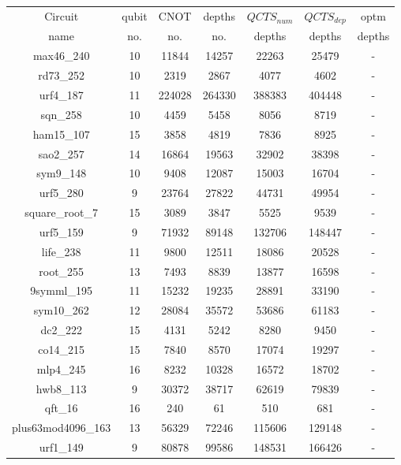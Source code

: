 \documentclass[runningheads]{llncs}
\begin{document}
								\begin{table}[H]
									\begin{center}  
									\begin{tabular}{|c|c|c|c|c|c|c|}
									\hline
									Circuit &  qubit  & CNOT &depths &$QCTS_{num}$& $QCTS_{dep}$  & optm 	  	\\
									 name	&   no. 	&	no. & no. & depths&  depths &  depths 	\\
									\hline
									max46\_240 & 10 & 11844 & 14257 & 22263 & 25479 & - \\
									rd73\_252 & 10 & 2319 & 2867 & 4077 & 4602 & - \\
									urf4\_187 & 11 & 224028 & 264330 & 388383 & 404448 & - \\
									sqn\_258 & 10 & 4459 & 5458 & 8056 & 8719 & - \\
									ham15\_107 & 15 & 3858 & 4819 & 7836 & 8925 & - \\
									sao2\_257 & 14 & 16864 & 19563 & 32902 & 38398 & - \\
									sym9\_148 & 10 & 9408 & 12087 & 15003 & 16704 & - \\
									urf5\_280 & 9 & 23764 & 27822 & 44731 & 49954 & - \\
									square\_root\_7 & 15 & 3089 & 3847 & 5525 & 9539 & - \\
									urf5\_159 & 9 & 71932 & 89148 & 132706 & 148447 & - \\
									life\_238 & 11 & 9800 & 12511 & 18086 & 20528 & - \\
									root\_255 & 13 & 7493 & 8839 & 13877 & 16598 & - \\
									9symml\_195 & 11 & 15232 & 19235 & 28891 & 33190 & - \\
									sym10\_262 & 12 & 28084 & 35572 & 53686 & 61183 & - \\
									dc2\_222 & 15 & 4131 & 5242 & 8280 & 9450 & - \\
									co14\_215 & 15 & 7840 & 8570 & 17074 & 19297 & - \\
									mlp4\_245 & 16 & 8232 & 10328 & 16572 & 18702 & - \\
									hwb8\_113 & 9 & 30372 & 38717 & 62619 & 79839 & - \\
									qft\_16 & 16 & 240 & 61 & 510 & 681 & - \\
									plus63mod4096\_163 & 13 & 56329 & 72246 & 115606 & 129148 & - \\
									urf1\_149 & 9 & 80878 & 99586 & 148531 & 166426 & - \\

\end{tabular}
\end{center}
\end{table}
\end{document}
